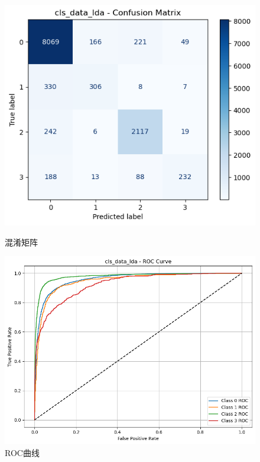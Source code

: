 \documentclass[10pt]{article}
\begin{document}
\begin{figure}[H]
\centering
\begin{minipage}[t]{0.45\textwidth}
  \centering
  \includegraphics[width=\linewidth]{cls_rf_lda1.png}
  \caption{混淆矩阵}
  \label{fig:63}
\end{minipage}
\hfill
\begin{minipage}[t]{0.52\textwidth}
  \centering
  \includegraphics[width=\linewidth]{cls_rf_lda2.png}
  \caption{ROC曲线}
  \label{fig:64}
\end{minipage}
\end{figure}
\end{document}
